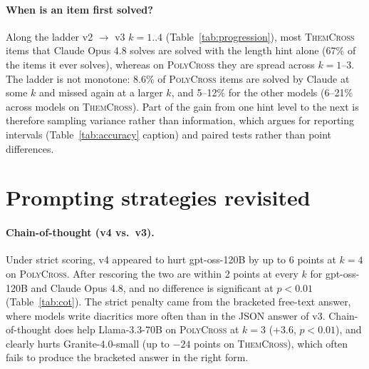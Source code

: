 \documentclass{article}
\newcommand{\poly}{\textsc{PolyCross}}
\newcommand{\them}{\textsc{ThemCross}}
\newcommand{\tabsize}{\small\setlength{\tabcolsep}{3.2pt}}
\begin{document}
\paragraph{When is an item first solved?} Along the ladder v2 $\rightarrow$ v3 $k{=}1..4$
(Table~\ref{tab:progression}), most \them{} items that Claude Opus 4.8 solves are solved with the
length hint alone (67\% of the items it ever solves), whereas on \poly{} they are spread across $k{=}1$--3. The ladder is not
monotone: 8.6\% of \poly{} items are solved by Claude at some $k$ and missed again at a larger $k$,
and 5--12\% for the other models (6--21\% across models on \them{}). Part of the gain from one hint level to the next is therefore
sampling variance rather than information, which argues for reporting intervals
(Table~\ref{tab:accuracy} caption) and paired tests rather than point differences.

\begin{table}[!htb]
\centering\tabsize
\caption{The hint level at which each item is first solved (\% of items), items never solved, and
items solved at some level but missed at a larger one.}
\label{tab:progression}

\end{table}

\section{Prompting strategies revisited}
\label{sec:prompts}

\paragraph{Chain-of-thought (v4 vs.\ v3).} Under strict scoring, v4 appeared to hurt gpt-oss-120B
by up to 6 points at $k{=}4$ on \poly{}. After rescoring the two are within 2 points at every $k$ for
gpt-oss-120B and Claude Opus 4.8, and no difference is significant at $p<0.01$ (Table~\ref{tab:cot}).
The strict penalty came from the bracketed free-text answer, where models write diacritics more
often than in the JSON answer of v3. Chain-of-thought does help Llama-3.3-70B on \poly{} at $k{=}3$
(+3.6, $p<0.01$), and clearly hurts Granite-4.0-small (up to $-24$ points on \them{}), which often
fails to produce the bracketed answer in the right form.

\begin{table}[!htb]
\centering\tabsize
\caption{Accuracy difference v4 $-$ v3 (points). $^{*}$: exact McNemar $p<0.01$.}
\label{tab:cot}

\end{table}
\end{document}
